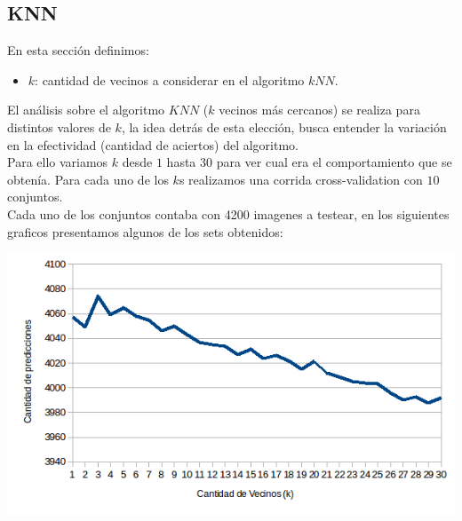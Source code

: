 \subsection{KNN}
En esta sección definimos:
\begin{itemize}
	\item $k$: cantidad de vecinos a considerar en el algoritmo $kNN$.
\end{itemize}
El análisis sobre el algoritmo $KNN$ ($k$ vecinos más cercanos) se realiza para distintos valores de $k$, la idea detrás de esta elección, busca entender la variación en la efectividad (cantidad de aciertos) del algoritmo.
\\
Para ello variamos $k$ desde $1$ hasta $30$ para ver cual era el comportamiento que se obtenía. Para cada uno de los $k$s realizamos una corrida cross-validation con $10$ conjuntos.
\\
Cada uno de los conjuntos contaba con 4200 imagenes a testear, en los siguientes graficos presentamos algunos de los sets obtenidos:

\includegraphics[scale=0.55]{nuevosResultados/knn/1.png}\\

